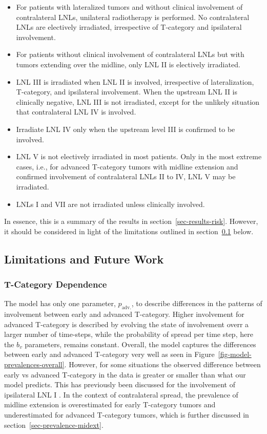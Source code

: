 \documentclass[
  sn-mathphys-num,
]{sn-jnl}
\providecommand{\tightlist}{%
  \setlength{\itemsep}{0pt}\setlength{\parskip}{0pt}}\usepackage{longtable,booktabs,array}
\begin{document}
\begin{itemize}
\tightlist
\item
  For patients with lateralized tumors and without clinical involvement
  of contralateral LNLs, unilateral radiotherapy is performed. No
  contralateral LNLs are electively irradiated, irrespective of
  T-category and ipsilateral involvement.
\item
  For patients without clinical involvement of contralateral LNLs but
  with tumors extending over the midline, only LNL II is electively
  irradiated.
\item
  LNL III is irradiated when LNL II is involved, irrespective of
  lateralization, T-category, and ipsilateral involvement. When the
  upstream LNL II is clinically negative, LNL III is not irradiated,
  except for the unlikely situation that contralateral LNL IV is
  involved.
\item
  Irradiate LNL IV only when the upstream level III is confirmed to be
  involved.
\item
  LNL V is not electively irradiated in most patients. Only in the most
  extreme cases, i.e., for advanced T-category tumors with midline
  extension and confirmed involvement of contralateral LNLs II to IV,
  LNL V may be irradiated.
\item
  LNLs I and VII are not irradiated unless clinically involved.
\end{itemize}

In essence, this is a summary of the results in
section~\ref{sec-results-risk}. However, it should be considered in
light of the limitations outlined in
section~\ref{sec-discussion-limitations} below.

\subsection{Limitations and Future
Work}\label{sec-discussion-limitations}

\subsubsection{T-Category Dependence}\label{t-category-dependence}

The model has only one parameter, \(p_\text{adv.}\), to describe
differences in the patterns of involvement between early and advanced
T-category. Higher involvement for advanced T-category is described by
evolving the state of involvement overr a larger number of time-steps,
while the probability of spread per time step, here the \(b_v\)
parameters, remains constant. Overall, the model captures the
differences between early and advanced T-category very well as seen in
Figure~\ref{fig-model-prevalences-overall}. However, for some situations
the observed difference between early vs advanced T-category in the data
is greater or smaller than what our model predicts. This has previously
been discussed for the involvement of ipsilateral LNL I
\citep{ludwig_modelling_2023}. In the context of contralateral spread,
the prevalence of midline extension is overestimated for early
T-category tumors and underestimated for advanced T-category tumors,
which is further discussed in section~\ref{sec-prevalence-midext}.
\end{document}
